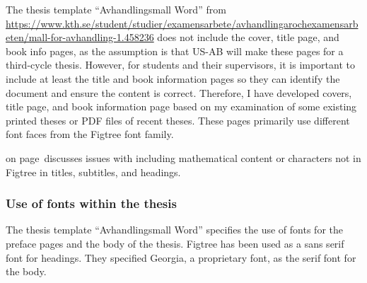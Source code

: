 \documentclass[12pt, twoside]{article}
\begin{document}
The thesis template \enquote{\foreignlanguage{swedish}{Avhandlingsmall Word}} from
\url{https://www.kth.se/student/studier/examensarbete/avhandlingarochexamensarbeten/mall-for-avhandling-1.458236} does not include the cover, title page, and book info pages, as the assumption is that US-AB will make these pages for a third-cycle thesis. However, for students and their supervisors, it is important to include at least the title and book information pages so they can identify the document and ensure the content is correct. Therefore, I have developed covers, title page, and book information page based on my examination of some existing printed theses or \gls{PDF} files of recent theses. These pages primarily use different font faces from the Figtree font family.

 on page\,\pageref{sec:configuringTitleSubtitle} discusses issues with including mathematical content or characters not in Figtree in titles, subtitles, and headings.


\subsubsection{Use of fonts within the thesis}
\label{sec:authorUseOfFontsWithinThesis}

The thesis template \enquote{\foreignlanguage{swedish}{Avhandlingsmall Word}} specifies the use of fonts for the preface pages and the body of the thesis. Figtree has been used as a sans serif font for headings. They specified Georgia, a proprietary font, as the serif font for the body.
\end{document}
